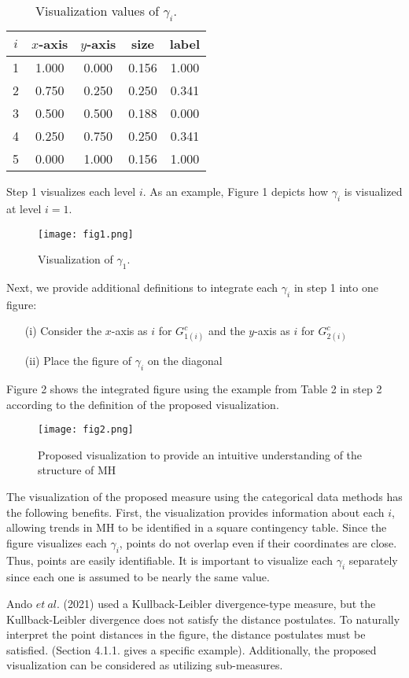 \documentclass[a4j,12pt]{article}
\begin{document}
\begin{table}[h]
\small\sf\centering
\caption{Visualization values of $\gamma_i$.\label{T3}}
\begin{tabular}[!bh]{ccccc} \hline
$i$	& $x$-axis	& $y$-axis	& size		& label	\\ \hline
1	& 1.000	& 0.000	& 0.156	& 1.000	\\
2	& 0.750	& 0.250	& 0.250	& 0.341	\\
3	& 0.500	& 0.500	& 0.188	& 0.000	\\
4	& 0.250	& 0.750	& 0.250	& 0.341	\\
5	& 0.000	& 1.000	& 0.156	& 1.000	\\ \hline
\end{tabular}
\end{table}
Step 1 visualizes each level $i$. 
As an example, Figure 1 depicts how $\gamma_i$ is visualized at level $i=1$.
\begin{figure}[h]
\centering
\texttt{[image: fig1.png]}
\caption{Visualization of $\gamma_1$.}
\end{figure}

Next, we provide additional definitions to integrate each $\gamma_i$ in step 1 into one figure:
\begin{enumerate}
\item[(i)] Consider the $x$-axis as $i$ for $G^c_{1(i)}$ and the $y$-axis as $i$ for $G^c_{2(i)}$
\item[(ii)] Place the figure of $\gamma_i$ on the diagonal
\end{enumerate}
Figure 2 shows the integrated figure using the example from Table 2 in step 2 according to the definition of the proposed visualization.
\begin{figure}[h]
\centering
\texttt{[image: fig2.png]}
\caption{Proposed visualization to provide an intuitive understanding of the structure of MH}
\end{figure}

The visualization of the proposed measure using the categorical data methods has the following benefits. 
First, the visualization provides information about each $i$, allowing trends in MH to be identified in a square contingency table. 
Since the figure visualizes each $\gamma_i$, points do not overlap even if their coordinates are close. 
Thus, points are easily identifiable. 
It is important to visualize each $\gamma_i$ separately since each one is assumed to be nearly the same value.

Ando $et~al.$ (2021) used a Kullback-Leibler divergence-type measure, but the Kullback-Leibler divergence does not satisfy the distance postulates. 
To naturally interpret the point distances in the figure, the distance postulates must be satisfied. (Section 4.1.1. gives a specific example). 
Additionally, the proposed visualization can be considered as utilizing sub-measures.
\\
\end{document}
